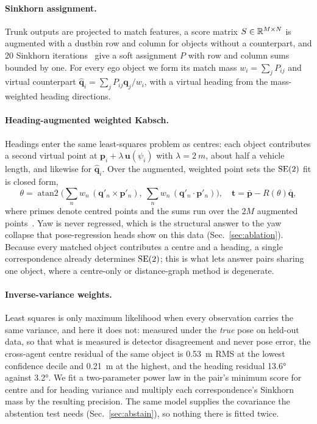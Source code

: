 \paragraph{Sinkhorn assignment.}
Trunk outputs are projected to match features, a score matrix $S\in\mathbb{R}^{M\times N}$ is augmented with a dustbin row and column for objects without a counterpart, and 20 Sinkhorn iterations~\cite{cuturi2013sinkhorn} give a soft assignment $P$ with row and column sums bounded by one. For every ego object we form its match mass $w_i=\sum_j P_{ij}$ and virtual counterpart $\hat{\mathbf{q}}_i=\sum_j P_{ij}\mathbf{q}_j/w_i$, with a virtual heading from the mass-weighted heading directions.

\paragraph{Heading-augmented weighted Kabsch.}
Headings enter the same least-squares problem as centres: each object contributes a second virtual point at $\mathbf{p}_i+\lambda\,\mathbf{u}(\psi_i)$ with $\lambda=\SI{2}{m}$, about half a vehicle length, and likewise for $\hat{\mathbf{q}}_i$. Over the augmented, weighted point sets the $\mathrm{SE}(2)$ fit is closed form,
\begin{equation}
\theta=\operatorname{atan2}\!\Big(\textstyle\sum_n w_n\,(\mathbf{q}'_n\!\times\!\mathbf{p}'_n),\ \sum_n w_n\,(\mathbf{q}'_n\!\cdot\!\mathbf{p}'_n)\Big),\quad
\mathbf{t}=\bar{\mathbf{p}}-R(\theta)\bar{\mathbf{q}},
\label{eq:kabsch}
\end{equation}
where primes denote centred points and the sums run over the $2M$ augmented points~\cite{kabsch1976solution}. Yaw is never regressed, which is the structural answer to the yaw collapse that pose-regression heads show on this data (Sec.~\ref{sec:ablation}). Because every matched object contributes a centre and a heading, a single correspondence already determines $\mathrm{SE}(2)$; this is what lets \paper answer pairs sharing one object, where a centre-only or distance-graph method is degenerate.

\paragraph{Inverse-variance weights.}
Least squares is only maximum likelihood when every observation carries the same variance, and here it does not: measured under the \emph{true} pose on held-out data, so that what is measured is detector disagreement and never pose error, the cross-agent centre residual of the same object is \SI{0.53}{m} RMS at the lowest confidence decile and \SI{0.21}{m} at the highest, and the heading residual \ang{13.6} against \ang{3.2}. We fit a two-parameter power law in the pair's minimum score for centre and for heading variance and multiply each correspondence's Sinkhorn mass by the resulting precision. The same model supplies the covariance the abstention test needs (Sec.~\ref{sec:abstain}), so nothing there is fitted twice.


